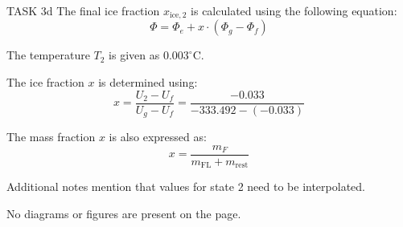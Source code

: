 TASK 3d  
The final ice fraction \( x_{\text{ice},2} \) is calculated using the following equation:  
\[
\Phi = \Phi_e + x \cdot (\Phi_g - \Phi_f)
\]  

The temperature \( T_2 \) is given as \( 0.003^\circ\text{C} \).  

The ice fraction \( x \) is determined using:  
\[
x = \frac{U_2 - U_f}{U_g - U_f} = \frac{-0.033}{-333.492 - (-0.033)}
\]  

The mass fraction \( x \) is also expressed as:  
\[
x = \frac{m_F}{m_{\text{FL}} + m_{\text{rest}}}
\]  

Additional notes mention that values for state 2 need to be interpolated.  

No diagrams or figures are present on the page.